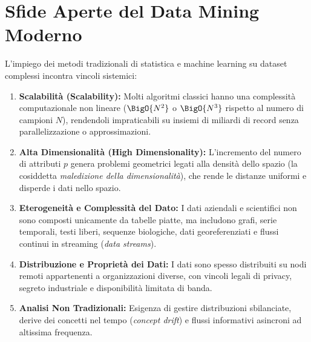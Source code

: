 \FloatBarrier
\section{Sfide Aperte del Data Mining Moderno}

L'impiego dei metodi tradizionali di statistica e machine learning su dataset complessi incontra vincoli sistemici:

\begin{enumerate}
    \item \textbf{Scalabilit\`a (Scalability):} Molti algoritmi classici hanno una complessit\`a computazionale non lineare ($\BigO{N^2}$ o $\BigO{N^3}$ rispetto al numero di campioni $N$), rendendoli impraticabili su insiemi di miliardi di record senza parallelizzazione o approssimazioni.
    \item \textbf{Alta Dimensionalit\`a (High Dimensionality):} L'incremento del numero di attributi $p$ genera problemi geometrici legati alla densit\`a dello spazio (la cosiddetta \textit{maledizione della dimensionalit\`a}), che rende le distanze uniformi e disperde i dati nello spazio.
    \item \textbf{Eterogeneit\`a e Complessit\`a del Dato:} I dati aziendali e scientifici non sono composti unicamente da tabelle piatte, ma includono grafi, serie temporali, testi liberi, sequenze biologiche, dati georeferenziati e flussi continui in streaming (\textit{data streams}).
    \item \textbf{Distribuzione e Propriet\`a dei Dati:} I dati sono spesso distribuiti su nodi remoti appartenenti a organizzazioni diverse, con vincoli legali di privacy, segreto industriale e disponibilit\`a limitata di banda.
    \item \textbf{Analisi Non Tradizionali:} Esigenza di gestire distribuzioni sbilanciate, derive dei concetti nel tempo (\textit{concept drift}) e flussi informativi asincroni ad altissima frequenza.
\end{enumerate}
